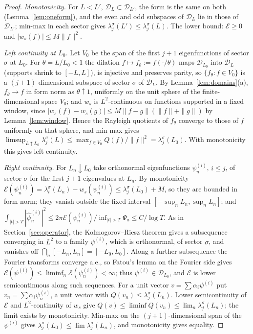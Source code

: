 \documentclass[11pt]{amsart}
\newcommand{\cE}{\mathcal{E}}
\theoremstyle{definition}
\theoremstyle{remark}
\numberwithin{equation}{section}
\begin{document}
\begin{proof}
\emph{Monotonicity.} For $L<L'$, $\mathcal D_L\subset\mathcal D_{L'}$, the form is the same on both (Lemma~\ref{lem:oneform}), and the even and odd subspaces of $\mathcal D_L$ lie in those of $\mathcal D_{L'}$; min-max in each sector gives $\lambda^\sigma_j(L')\le\lambda^\sigma_j(L)$. The lower bound: $\cE\ge0$ and $|w_s(f)|\le M\|f\|^2$.

\emph{Left continuity at $L_0$.} Let $V_0$ be the span of the first $j+1$ eigenfunctions of sector $\sigma$ at $L_0$. For $\theta=L/L_0<1$ the dilation $f\mapsto f_\theta:=f(\cdot/\theta)$ maps $\mathcal D_{L_0}$ into $\mathcal D_L$ (supports shrink to $[-L,L]$), is injective and preserves parity, so $\{f_\theta:f\in V_0\}$ is a $(j+1)$-dimensional subspace of sector $\sigma$ of $\mathcal D_L$. By Lemma~\ref{lem:domains}(a), $f_\theta\to f$ in form norm as $\theta\uparrow1$, uniformly on the unit sphere of the finite-dimensional space $V_0$; and $w_s$ is $L^2$-continuous on functions supported in a fixed window, since $|w_s(f)-w_s(g)|\le M\|f-g\|(\|f\|+\|g\|)$ by Lemma~\ref{lem:window}. Hence the Rayleigh quotients of $f_\theta$ converge to those of $f$ uniformly on that sphere, and min-max gives $\limsup_{L\uparrow L_0}\lambda^\sigma_j(L)\le\max_{f\in V_0}Q(f)/\|f\|^2=\lambda^\sigma_j(L_0)$. With monotonicity this gives left continuity.

\emph{Right continuity.} For $L_n\downarrow L_0$ take orthonormal eigenfunctions $\psi^{(i)}_n$, $i\le j$, of sector $\sigma$ for the first $j+1$ eigenvalues at $L_n$. By monotonicity $\cE(\psi^{(i)}_n)=\lambda^\sigma_i(L_n)-w_s(\psi^{(i)}_n)\le\lambda^\sigma_j(L_0)+M$, so they are bounded in form norm; they vanish outside the fixed interval $[-\sup_nL_n,\sup_nL_n]$; and $\int_{|t|>T}|\hat\psi^{(i)}_n|^2\le2\pi\cE(\psi^{(i)}_n)/\inf_{|t|>T}\Psi_a\le C/\log T$. As in Section~\ref{sec:operator}, the Kolmogorov--Riesz theorem gives a subsequence converging in $L^2$ to a family $\psi^{(i)}$, which is orthonormal, of sector $\sigma$, and vanishes off $\bigcap_n[-L_n,L_n]=[-L_0,L_0]$. Along a further subsequence the Fourier transforms converge a.e., so Fatou's lemma on the Fourier side gives $\cE(\psi^{(i)})\le\liminf_n\cE(\psi^{(i)}_n)<\infty$; thus $\psi^{(i)}\in\mathcal D_{L_0}$, and $\cE$ is lower semicontinuous along such sequences. For a unit vector $v=\sum\alpha_i\psi^{(i)}$ put $v_n=\sum\alpha_i\psi^{(i)}_n$, a unit vector with $Q(v_n)\le\lambda^\sigma_j(L_n)$. Lower semicontinuity of $\cE$ and $L^2$-continuity of $w_s$ give $Q(v)\le\liminf Q(v_n)\le\lim_n\lambda^\sigma_j(L_n)$; the limit exists by monotonicity. Min-max on the $(j+1)$-dimensional span of the $\psi^{(i)}$ gives $\lambda^\sigma_j(L_0)\le\lim\lambda^\sigma_j(L_n)$, and monotonicity gives equality.


\end{proof}
\end{document}
